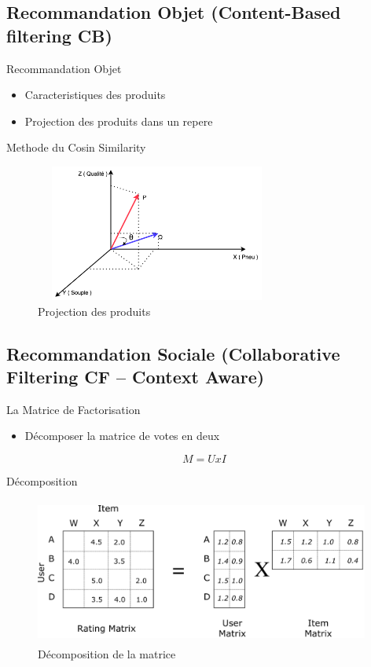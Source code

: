 \documentclass[xelatex,12pt]{beamer}
\begin{document}
\subsection{Recommandation Objet (Content-Based filtering CB)}
\begin{frame}{Recommandation Objet}
\begin{itemize}
  \item Caracteristiques des produits
  \item Projection des produits dans un repere
  \end{itemize}
\end{frame}

\begin{frame}{Methode du Cosin Similarity}
\begin{figure}[h]
\begin{center}
\includegraphics[width=8cm,height=4.5cm]{images/cosin_similarity.png}
\caption[Projection des produits]{Projection des produits}
\label{monlabel}
\end{center}
\end{figure}
\end{frame}


\subsection{Recommandation Sociale (Collaborative Filtering CF – Context Aware)}
\begin{frame}{La Matrice de Factorisation}
\begin{itemize}
  \item Décomposer la matrice de votes en deux
  \end{itemize}
  $$M = U x I$$
\end{frame}

\begin{frame}{Décomposition}
\begin{figure}[h]
\begin{center}
\includegraphics[width=11cm,height=4.8cm]{images/factorisation_matrix.png}
\caption[Décomposition de la matrice]{Décomposition de la matrice}
\label{monlabel}
\end{center}
\end{figure}
\end{frame}
\end{document}
